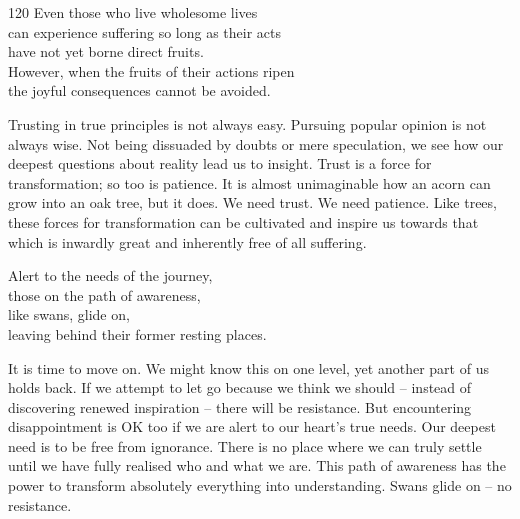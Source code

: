 
\begin{dhpVerse}{120}
\label{dhp-120}
Even those who live wholesome lives\\
can experience suffering so long as their acts\\
have not yet borne direct fruits.\\
However, when the fruits of their actions ripen\\
the joyful consequences cannot be avoided.
\end{dhpVerse}

\begin{dhpRefl}

Trusting in true principles is not always easy. Pursuing popular
opinion is not always wise. Not being dissuaded by doubts or mere
speculation, we see how our deepest questions about reality lead us
to insight. Trust is a force for transformation; so too is patience.
It is almost unimaginable how an acorn can grow into an oak tree, but
it does. We need trust. We need patience. Like trees, these forces
for transformation can be cultivated and inspire us towards that
which is inwardly great and inherently free of all suffering.

\end{dhpRefl}


\begin{dhpVerse}{91}
\label{dhp-91}
Alert to the needs of the journey,\\
those on the path of awareness,\\
like swans, glide on,\\
leaving behind their former resting places.
\end{dhpVerse}

\begin{dhpRefl}

It is time to move on. We might know this on one level, yet another
part of us holds back. If we attempt to let go because we think we
should -- instead of discovering renewed inspiration -- there will be
resistance. But encountering disappointment is OK too if we are alert
to our heart's true needs. Our deepest need is to be free from
ignorance. There is no place where we can truly settle until we have fully
realised who and what we are. This path of awareness has the power to
transform absolutely everything into understanding. Swans glide on --
no resistance.

\end{dhpRefl}

